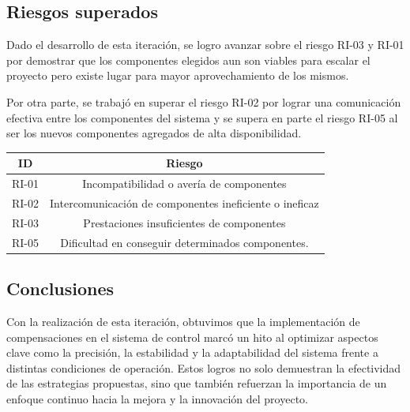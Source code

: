 \subsection{Riesgos superados}

Dado el desarrollo de esta iteración, se logro avanzar sobre el riesgo RI-03 y RI-01 por demostrar que los componentes elegidos aun son viables para escalar el proyecto pero existe lugar para mayor aprovechamiento de los mismos.

Por otra parte, se trabajó en superar el riesgo RI-02 por lograr una comunicación efectiva entre los componentes del sistema y se supera en parte el riesgo RI-05 al ser los nuevos componentes agregados de alta disponibilidad.

\begin{center} \begin{tabular}{|c|c|}
    \hline \rowcolor{test_header_color}
        ID & Riesgo \\
    \hline
        RI-01 & Incompatibilidad o avería de componentes \\
    \hline
        RI-02 & Intercomunicación de componentes ineficiente o ineficaz \\
    \hline
        RI-03 & Prestaciones insuficientes de componentes \\
    \hline
        RI-05 & Dificultad en conseguir determinados componentes. \\
    \hline
\end{tabular} \end{center}

\subsection{Conclusiones}

Con la realización de esta iteración, obtuvimos que la implementación de compensaciones en el sistema de control marcó un hito al optimizar aspectos clave como la precisión, la estabilidad y la adaptabilidad del sistema frente a distintas condiciones de operación. Estos logros no solo demuestran la efectividad de las estrategias propuestas, sino que también refuerzan la importancia de un enfoque continuo hacia la mejora y la innovación del proyecto.
